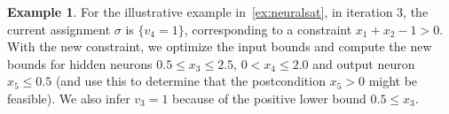 \documentclass[oneside,11pt,dvipsnames]{book}
\numberwithin{equation}{section}
\theoremstyle{definition}
\newtheorem{example}{Example}[section]
\theoremstyle{remark}
\newcommand{\tvn}[1]{\iftoggle{usecomment}{{\color{red}{[TVN]: #1}}}{}}
\newcommand{\mbd}[1]{\iftoggle{usecomment}{{\color{magenta}{[MBD]: #1}}}{}}
\newcommand{\hd}[1]{\iftoggle{usecomment}{{\color{blue}{[HD]: #1}}}{}}
\newcommand{\tool}{\texttt{NeuralSAT}}
\begin{document}

\begin{example} For the illustrative example in~\autoref{ex:neuralsat}, in iteration 3, the current assignment $\sigma$ is  $\{v_4=1\}$, corresponding to a constraint $x_1 + x_2 - 1 > 0$. With the new constraint, we optimize the input bounds and compute the new bounds for hidden neurons $0.5 \le x_3 \le 2.5$, $0 < x_4 \le 2.0$ and output neuron  $x_5 \le 0.5$ (and use this to determine that the postcondition $x_5 > 0$ might be feasible). We also infer $v_3=1$ because of the positive lower bound $0.5 \le x_3$.
\end{example}





\end{document}
